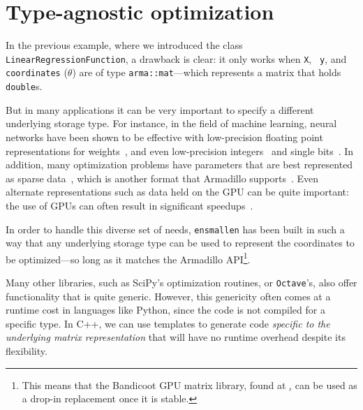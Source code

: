 \section{Type-agnostic optimization}
\label{sec:templated_optimize}


In the previous example, where we introduced the class {\tt
LinearRegressionFunction}, a drawback is clear: it only works when {\tt X}, {\tt
y}, and {\tt coordinates} ($\theta$) are of type {\tt arma::mat}---which
represents a matrix that holds {\tt double}s.

But in many applications it can be very important to specify a different
underlying storage type.  For instance, in the field of machine learning, neural
networks have been shown to be effective with low-precision floating point
representations for weights~\cite{TODO}, and even low-precision
integers~\cite{TODO} and single bits~\cite{TODO}.  In addition, many
optimization problems have parameters that are best represented as sparse
data~\cite{TODO}, which is another format that Armadillo supports~\cite{TODO}.
Even alternate representations such as data held on the GPU can be quite
important: the use of GPUs can often result in significant speedups~\cite{TODO}.

In order to handle this diverse set of needs, {\tt ensmallen} has been built in
such a way that any underlying storage type can be used to represent the
coordinates to be optimized---so long as it matches the Armadillo
API\footnote{This means that the Bandicoot GPU matrix library, found at
\href{https://gitlab.com/conradsnicta/bandicoot-code}, can be used as a drop-in
replacement once it is stable.}.

Many other libraries, such as SciPy's optimization routines, or {\tt Octave}'s,
also offer functionality that is quite generic.  However, this genericity often
comes at a runtime cost in languages like Python, since the code is not compiled
for a specific type.  In C++, we can use templates to generate code {\it
specific to the underlying matrix representation} that will have no runtime
overhead despite its flexibility.


